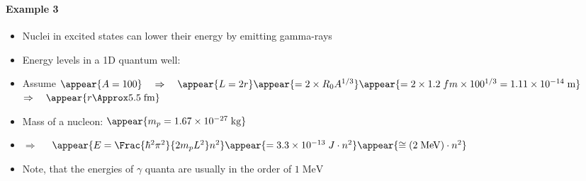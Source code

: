 \begin{frame}
\frametitle{\texorpdfstring{\culine[\sectiontitleulinecolor]{\sectiontitle}}{\sectiontitle} }
\framesubtitle{Example 3}
%
\begin{itemize}
	\item Nuclei in excited states can lower their energy by emitting gamma-rays    

\item Energy levels in a 1D quantum well: 

\item Assume $\appear{A=100} \quad \Rightarrow \quad \appear{L=2 r}\appear{=2 \times R_{0} A^{1 / 3}}\appear{=2 \times 1.2 \;fm \times 100^{1 / 3}=1.11 \times 10^{-14} \mathrm{\;m}}$ \\
 $\Rightarrow \quad \appear{r \Approx 5.5 \mathrm{\;fm}}$

\item Mass of a nucleon: $\appear{m_{p}=1.67 \times 10^{-27} \mathrm{\;kg} }$

\item[] $\Rightarrow$  $\quad \appear{E=\Frac{\hbar^{2} \pi^{2}}{2 m_{p} L^{2}} n^{2}}\appear{=3.3 \times 10^{-13} \;J \cdot n^{2}} \appear{\cong(2 \mathrm{\;MeV}) \cdot n^{2}}$

\item Note, that the energies of $\gamma$ quanta are usually in the order of $1 \mathrm{\;MeV}$
\end{itemize}

\endofsection
\end{frame}

